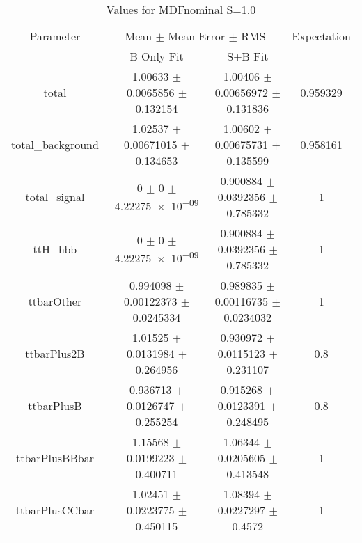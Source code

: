 \begin{table}
\centering
\caption{Values for MDFnominal S=1.0}
\begin{tabular}{cccc}
\toprule
Parameter & \multicolumn{2}{c}{Mean $\pm$ Mean Error $\pm$ RMS} & Expectation\\
 & B-Only Fit & S+B Fit & \\
\midrule
total & \num{1.00633} $\pm$ \num{0.0065856} $\pm$ \num{0.132154} & \num{1.00406} $\pm$ \num{0.00656972} $\pm$ \num{0.131836} & \num{0.959329}\\
total\_background & \num{1.02537} $\pm$ \num{0.00671015} $\pm$ \num{0.134653} & \num{1.00602} $\pm$ \num{0.00675731} $\pm$ \num{0.135599} & \num{0.958161}\\
total\_signal & \num{0} $\pm$ \num{0} $\pm$ \num{4.22275e-09} & \num{0.900884} $\pm$ \num{0.0392356} $\pm$ \num{0.785332} & \num{1}\\
ttH\_hbb & \num{0} $\pm$ \num{0} $\pm$ \num{4.22275e-09} & \num{0.900884} $\pm$ \num{0.0392356} $\pm$ \num{0.785332} & \num{1}\\
ttbarOther & \num{0.994098} $\pm$ \num{0.00122373} $\pm$ \num{0.0245334} & \num{0.989835} $\pm$ \num{0.00116735} $\pm$ \num{0.0234032} & \num{1}\\
ttbarPlus2B & \num{1.01525} $\pm$ \num{0.0131984} $\pm$ \num{0.264956} & \num{0.930972} $\pm$ \num{0.0115123} $\pm$ \num{0.231107} & \num{0.8}\\
ttbarPlusB & \num{0.936713} $\pm$ \num{0.0126747} $\pm$ \num{0.255254} & \num{0.915268} $\pm$ \num{0.0123391} $\pm$ \num{0.248495} & \num{0.8}\\
ttbarPlusBBbar & \num{1.15568} $\pm$ \num{0.0199223} $\pm$ \num{0.400711} & \num{1.06344} $\pm$ \num{0.0205605} $\pm$ \num{0.413548} & \num{1}\\
ttbarPlusCCbar & \num{1.02451} $\pm$ \num{0.0223775} $\pm$ \num{0.450115} & \num{1.08394} $\pm$ \num{0.0227297} $\pm$ \num{0.4572} & \num{1}\\
\bottomrule
\end{tabular}
\end{table}